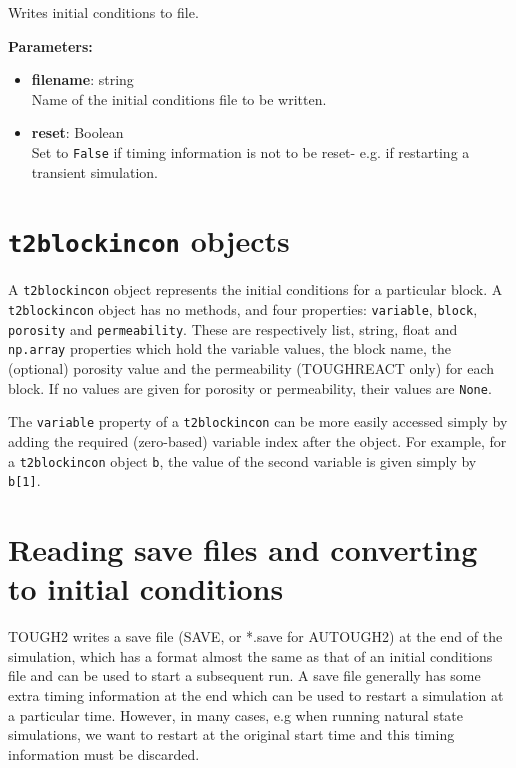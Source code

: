 Writes initial conditions to file.

\textbf{Parameters:}
\begin{itemize}
\item \textbf{filename}: string\\
  Name of the initial conditions file to be written.
\item \textbf{reset}: Boolean\\
  Set to \texttt{False} if timing information is not to be reset- e.g. if restarting a transient simulation.
\end{itemize}

\section{\texttt{t2blockincon} objects}
\label{t2blockincons}

A \texttt{t2blockincon} object represents the initial conditions for a particular block.  A \texttt{t2blockincon} object has no methods, and four properties: \texttt{variable}, \texttt{block}, \texttt{porosity} and \texttt{permeability}.  These are respectively list, string, float and \texttt{np.array} properties which hold the variable values, the block name, the (optional) porosity value and the permeability (TOUGHREACT only) for each block.  If no values are given for porosity or permeability, their values are \texttt{None}.

The \texttt{variable} property of a \texttt{t2blockincon} can be more easily accessed simply by adding the required (zero-based) variable index after the object.  For example, for a \texttt{t2blockincon} object \texttt{b}, the value of the second variable is given simply by \texttt{b[1]}.

\section{Reading save files and converting to initial conditions}

TOUGH2 writes a save file (SAVE, or *.save for AUTOUGH2) at the end of the simulation, which has a format almost the same as that of an initial conditions file and can be used to start a subsequent run.  A save file generally has some extra timing information at the end which can be used to restart a simulation at a particular time.  However, in many cases, e.g when running natural state simulations, we want to restart at the original start time and this timing information must be discarded.

